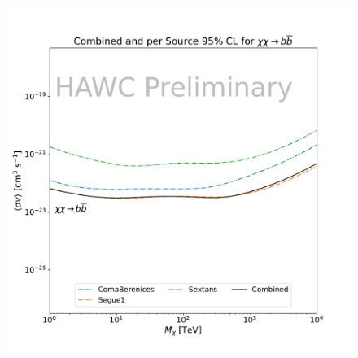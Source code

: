 \begin{figure}[h]
{    \includegraphics[scale=0.21]{figures/mtd_hawc_dm/results/Combined95_New_duck_bb_.pdf}
    }
    \caption{}
\label{fig:mtd_limits_1of2}
\end{figure}

